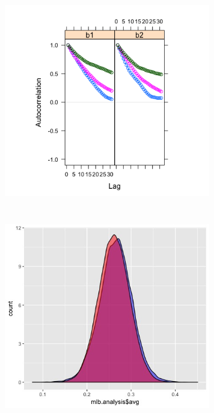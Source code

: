 \documentclass[10pt,a4paper]{article}
\begin{document}
\begin{figure}[H]
\begin{center}
\includegraphics[width=9cm,height=9cm]{../ACFPlot.png}
\caption{}
\label{fig}
\end{center}
\end{figure}

\begin{figure}[H]
\begin{center}
\includegraphics[width=9cm,height=9cm]{../BayesianPredictionPlot.jpeg}
\caption{}
\label{fig1}
\end{center}
\end{figure}
\end{document}

